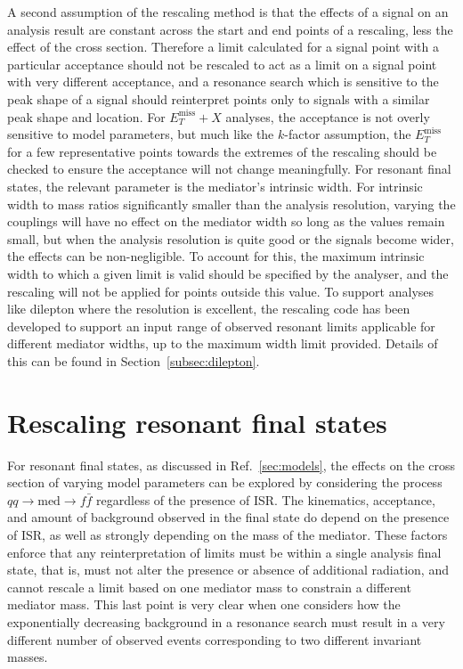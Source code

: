 \documentclass[a4paper, 11pt]{article}
\newcommand{\MET}{\ensuremath{E_T^\mathrm{miss}}\xspace}
\newcommand{\metplusx}{\ensuremath{\MET+X}\xspace}
\begin{document}
A second assumption of the rescaling method is that the effects of a signal on an analysis result are constant across the start and end points of a rescaling, less the effect of the cross section. Therefore a limit calculated for a signal point with a particular acceptance should not be rescaled to act as a limit on a signal point with very different acceptance, and a resonance search which is sensitive to the peak shape of a signal should reinterpret points only to signals with a similar peak shape and location. For \metplusx analyses, the acceptance is not overly sensitive to model parameters, but much like the $k$-factor assumption, the \MET for a few representative points towards the extremes of the rescaling should be checked to ensure the acceptance will not change meaningfully. For resonant final states, the relevant parameter is the mediator's intrinsic width. For intrinsic width to mass ratios significantly smaller than the analysis resolution,
varying the couplings will have no effect on the mediator width so long as the values remain small, but when the analysis resolution is quite good or the signals become wider, the effects can be non-negligible. To account for this, the maximum intrinsic width to which a given limit is valid should be specified by the analyser, and the rescaling will not be applied for points outside this value. To support analyses like dilepton where the resolution is excellent, the rescaling code has been developed to support an input range of observed resonant limits applicable for different mediator widths, up to the maximum width limit provided. Details of this can be found in Section~\ref{subsec:dilepton}.

\section{Rescaling resonant final states}
\label{sec:resonant}

For resonant final states, as discussed in Ref.~\ref{sec:models}, the effects on the cross section of varying model parameters can be explored by considering the process $qq\rightarrow \text{med} \rightarrow f \bar{f}$ regardless of the presence of ISR. The kinematics, acceptance, and amount of background observed in the final state do depend on the presence of ISR, as well as strongly depending on the mass of the mediator. These factors enforce that any reinterpretation of limits must be within a single analysis final state, that is, must not alter the presence or absence of additional radiation, and cannot rescale a limit based on one mediator mass to constrain a different mediator mass. This last point is very clear when one considers how the exponentially decreasing background in a resonance search must result in a very different number of observed events corresponding to two different invariant masses. 
\end{document}
